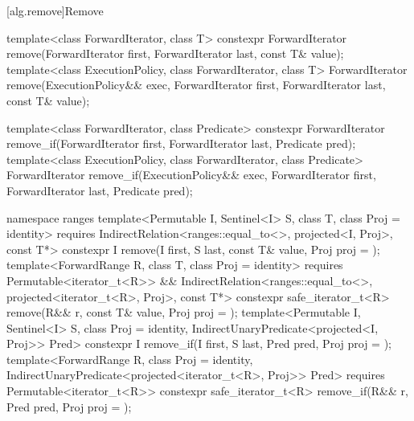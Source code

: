 [alg.remove]{Remove}

%
%
\begin{itemdecl}
template<class ForwardIterator, class T>
  constexpr ForwardIterator remove(ForwardIterator first, ForwardIterator last,
                                   const T& value);
template<class ExecutionPolicy, class ForwardIterator, class T>
  ForwardIterator remove(ExecutionPolicy&& exec,
                         ForwardIterator first, ForwardIterator last,
                         const T& value);

template<class ForwardIterator, class Predicate>
  constexpr ForwardIterator remove_if(ForwardIterator first, ForwardIterator last,
                                      Predicate pred);
template<class ExecutionPolicy, class ForwardIterator, class Predicate>
  ForwardIterator remove_if(ExecutionPolicy&& exec,
                            ForwardIterator first, ForwardIterator last,
                            Predicate pred);

namespace ranges {
  template<Permutable I, Sentinel<I> S, class T, class Proj = identity>
    requires IndirectRelation<ranges::equal_to<>, projected<I, Proj>, const T*>
    constexpr I remove(I first, S last, const T& value, Proj proj = {});
  template<ForwardRange R, class T, class Proj = identity>
    requires Permutable<iterator_t<R>> &&
      IndirectRelation<ranges::equal_to<>, projected<iterator_t<R>, Proj>, const T*>
    constexpr safe_iterator_t<R>
      remove(R&& r, const T& value, Proj proj = {});
  template<Permutable I, Sentinel<I> S, class Proj = identity,
      IndirectUnaryPredicate<projected<I, Proj>> Pred>
    constexpr I remove_if(I first, S last, Pred pred, Proj proj = {});
  template<ForwardRange R, class Proj = identity,
      IndirectUnaryPredicate<projected<iterator_t<R>, Proj>> Pred>
    requires Permutable<iterator_t<R>>
    constexpr safe_iterator_t<R>
      remove_if(R&& r, Pred pred, Proj proj = {});
}
\end{itemdecl}

